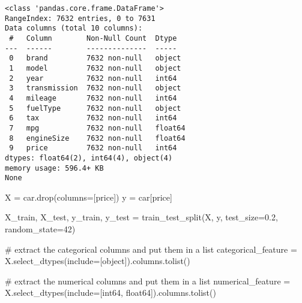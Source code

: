\documentclass[
  letterpaper,
  DIV=11,
  numbers=noendperiod]{scrreprt}
\newenvironment{Shaded}{\begin{snugshade}}{\end{snugshade}}
\newcommand{\CommentTok}[1]{\textcolor[rgb]{0.37,0.37,0.37}{#1}}
\newcommand{\DecValTok}[1]{\textcolor[rgb]{0.68,0.00,0.00}{#1}}
\newcommand{\FloatTok}[1]{\textcolor[rgb]{0.68,0.00,0.00}{#1}}
\newcommand{\NormalTok}[1]{\textcolor[rgb]{0.00,0.23,0.31}{#1}}
\newcommand{\OperatorTok}[1]{\textcolor[rgb]{0.37,0.37,0.37}{#1}}
\newcommand{\StringTok}[1]{\textcolor[rgb]{0.13,0.47,0.30}{#1}}
\begin{document}
\begin{verbatim}
<class 'pandas.core.frame.DataFrame'>
RangeIndex: 7632 entries, 0 to 7631
Data columns (total 10 columns):
 #   Column        Non-Null Count  Dtype  
---  ------        --------------  -----  
 0   brand         7632 non-null   object 
 1   model         7632 non-null   object 
 2   year          7632 non-null   int64  
 3   transmission  7632 non-null   object 
 4   mileage       7632 non-null   int64  
 5   fuelType      7632 non-null   object 
 6   tax           7632 non-null   int64  
 7   mpg           7632 non-null   float64
 8   engineSize    7632 non-null   float64
 9   price         7632 non-null   int64  
dtypes: float64(2), int64(4), object(4)
memory usage: 596.4+ KB
None
\end{verbatim}

\begin{Shaded}
\begin{Highlighting}[]
\NormalTok{X }\OperatorTok{=}\NormalTok{ car.drop(columns}\OperatorTok{=}\NormalTok{[}\StringTok{\textquotesingle{}price\textquotesingle{}}\NormalTok{])}
\NormalTok{y }\OperatorTok{=}\NormalTok{ car[}\StringTok{\textquotesingle{}price\textquotesingle{}}\NormalTok{]}

\NormalTok{X\_train, X\_test, y\_train, y\_test }\OperatorTok{=}\NormalTok{ train\_test\_split(X, y, test\_size}\OperatorTok{=}\FloatTok{0.2}\NormalTok{, random\_state}\OperatorTok{=}\DecValTok{42}\NormalTok{)}

\CommentTok{\# extract the categorical columns and put them in a list}
\NormalTok{categorical\_feature }\OperatorTok{=}\NormalTok{ X.select\_dtypes(include}\OperatorTok{=}\NormalTok{[}\StringTok{\textquotesingle{}object\textquotesingle{}}\NormalTok{]).columns.tolist()}

\CommentTok{\# extract the numerical columns and put them in a list}
\NormalTok{numerical\_feature }\OperatorTok{=}\NormalTok{ X.select\_dtypes(include}\OperatorTok{=}\NormalTok{[}\StringTok{\textquotesingle{}int64\textquotesingle{}}\NormalTok{, }\StringTok{\textquotesingle{}float64\textquotesingle{}}\NormalTok{]).columns.tolist()}
\end{Highlighting}
\end{Shaded}
\end{document}
